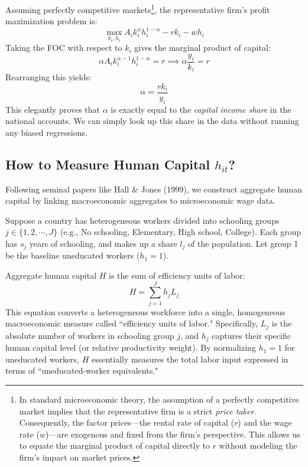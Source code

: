 Assuming perfectly competitive markets\footnote{
    In standard microeconomic theory, the assumption of a perfectly competitive market implies that the representative firm is a strict \textit{price taker}. Consequently, the factor prices—the rental rate of capital ($r$) and the wage rate ($w$)—are exogenous and fixed from the firm's perspective. This allows us to equate the marginal product of capital directly to $r$ without modeling the firm's impact on market prices.
}, the representative firm's profit maximization problem is:
\[
\max_{k_i, h_i} A_i k_i^\alpha h_i^{1-\alpha} - r k_i - w h_i
\]
Taking the FOC with respect to $k_i$ gives the marginal product of capital:
\[
\alpha A_i k_i^{\alpha-1} h_i^{1-\alpha} = r \implies \alpha \frac{y_i}{k_i} = r
\]
Rearranging this yields:
\[
\alpha = \frac{r k_i}{y_i}
\]
This elegantly proves that $\alpha$ is exactly equal to the \textit{capital income share} in the national accounts. We can simply look up this share in the data without running any biased regressions.

\subsection{How to Measure Human Capital $h_{it}$?}

Following seminal papers like Hall \& Jones (1999), we construct aggregate human capital by linking macroeconomic aggregates to microeconomic wage data.

Suppose a country has heterogeneous workers divided into schooling groups $j \in \{1, 2, \cdots, J\}$ (e.g., No schooling, Elementary, High school, College). Each group has $s_j$ years of schooling, and makes up a share $l_j$ of the population. Let group 1 be the baseline uneducated workers ($h_1 = 1$). 

Aggregate human capital $H$ is the sum of efficiency units of labor:
\[
H = \sum_{j = 1}^J h_j L_j
\]
This equation converts a heterogeneous workforce into a single, homogeneous macroeconomic measure called ``efficiency units of labor." Specifically, $L_j$ is the absolute number of workers in schooling group $j$, and $h_j$ captures their specific human capital level (or relative productivity weight). By normalizing $h_1 = 1$ for uneducated workers, $H$ essentially measures the total labor input expressed in terms of ``uneducated-worker equivalents."


